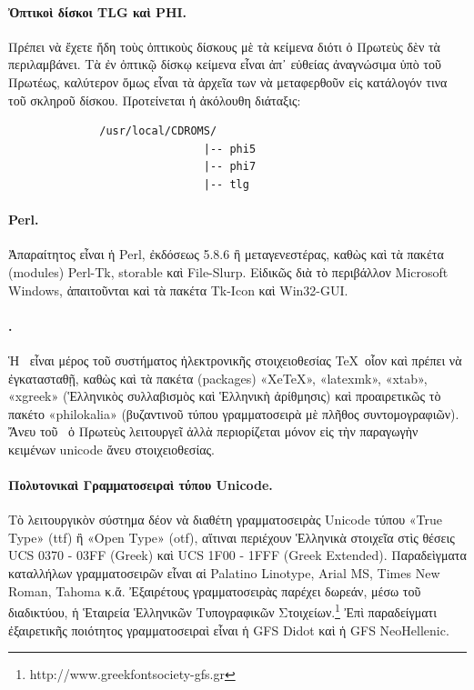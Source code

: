 \documentclass[12pt,a4paper]{article}
\begin{document}
  \paragraph{Ὀπτικοὶ δίσκοι TLG καὶ PHI.}
    Πρέπει νὰ ἔχετε ἤδη τοὺς ὀπτικοὺς δίσκους μὲ τὰ κείμενα
    διότι ὁ Πρωτεὺς δὲν τὰ περιλαμβάνει.
    Τὰ ἐν ὀπτικῷ δίσκῳ κείμενα εἶναι ἀπ᾽ εὐθείας ἀναγνώσιμα ὑπὸ
    τοῦ Πρωτέως, καλύτερον ὅμως εἶναι τὰ ἀρχεῖα των νὰ μεταφερθοῦν εἰς
    κατάλογόν τινα τοῦ σκληροῦ δίσκου. Προτείνεται ἡ ἀκόλουθη διάταξις:
  \begin{verbatim}
              /usr/local/CDROMS/
                              |-- phi5
                              |-- phi7
                              |-- tlg
  \end{verbatim}
  \paragraph{Perl.}
    Ἀπαραίτητος εἶναι ἡ Perl, ἐκδόσεως 5.8.6 ἢ μεταγενεστέρας,
    καθὼς καὶ τὰ πακέτα (modules) Perl-Tk, storable καὶ File-Slurp.
    Εἰδικῶς διὰ τὸ περιβάλλον Microsoft Windows, ἀπαιτοῦνται καὶ τὰ
    πακέτα Tk-Icon καὶ Win32-GUI.
  \paragraph{\XeTeX.}
    Ἡ \XeTeX\ εἶναι μέρος τοῦ συστήματος ἠλεκτρονικῆς στοιχειοθεσίας
    \TeX\ οἷον καὶ πρέπει νὰ ἐγκατασταθῇ, καθὼς καὶ τὰ πακέτα
    (packages) «XeTeX», «latexmk», «xtab», «xgreek» (Ἑλληνικὸς συλλαβισμὸς
    καὶ Ἑλληνικὴ ἀρίθμησις) καὶ προαιρετικῶς τὸ πακέτο
    «philokalia» (βυζαντινοῦ τύπου γραμματοσειρὰ μὲ πλῆθος
    συντομογραφιῶν). Ἄνευ τοῦ \XeTeX\ ὁ Πρωτεὺς λειτουργεῖ
    ἀλλὰ περιορίζεται μόνον εἰς τὴν παραγωγὴν κειμένων unicode ἄνευ
    στοιχειοθεσίας.
  \paragraph{Πολυτονικαὶ Γραμματοσειραὶ τύπου Unicode.}
    Τὸ λειτουργικὸν σύστημα δέον νὰ διαθέτη γραμματοσειρὰς Unicode
    τύπου «True Type» (ttf) ἢ «Open Type» (otf), αἵτιναι περιέχουν
    Ἑλληνικὰ στοιχεῖα στὶς θέσεις UCS 0370 - 03FF (Greek)
    καὶ UCS 1F00 - 1FFF (Greek Extended).
    Παραδεὶγματα καταλλήλων γραμματοσειρῶν εἶναι αἱ Palatino Linotype,
    Arial MS, Times New Roman, Tahoma κ.ἄ.
    Ἐξαιρέτους γραμματοσειρὰς παρέχει
    δωρεάν, μέσω τοῦ διαδικτύου, ἡ Ἑταιρεία Ἑλληνικῶν Τυπογραφικῶν
    Στοιχείων.\footnote{http://www.greekfontsociety-gfs.gr}
    Ἐπὶ παραδείγματι ἐξαιρετικῆς ποιότητος γραμματοσειραὶ εἶναι
    ἡ GFS Didot καὶ ἡ GFS NeoHellenic.
%
\end{document}
